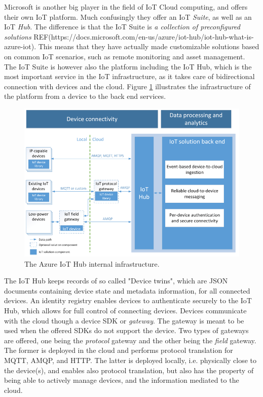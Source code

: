 Microsoft is another big player in the field of IoT Cloud computing, and offers their own IoT platform. Much confusingly they offer an IoT \textit{Suite}, as well as an IoT \textit{Hub}. The difference is that the IoT Suite is \textit{a collection of preconfigured solutions} REF(https://docs.microsoft.com/en-us/azure/iot-hub/iot-hub-what-is-azure-iot). This means that they have actually made customizable solutions based on common IoT scenarios, such as remote monitoring and asset management. The IoT Suite is however also the platform including the IoT Hub, which is the most important service in the IoT infrastructure, as it takes care of bidirectional connection with devices and the cloud. Figure \ref{fig:azure:infrastructure} illustrates the infrastructure of the platform from a device to the back end services. 

\begin{figure}[h!]
	\centering
	\includegraphics[width=\textwidth]{figures/azure/infrastructure.png}
	\caption{The Azure IoT Hub internal infrastructure.}
	\label{fig:azure:infrastructure}
\end{figure}


The IoT Hub keeps records of so called "Device twins", which are JSON documents containing device state and metadata information, for all connected devices. An identity registry enables devices to authenticate securely to the IoT Hub, which allows for full control of connecting devices. Devices communicate with the cloud though a device SDK or \textit{gateway}. The gateway is meant to be used when the offered SDKs do not support the device. Two types of gateways are offered, one being the \textit{protocol} gateway and the other being the \textit{field} gateway. The former is deployed in the cloud and performs protocol translation for MQTT, AMQP, and HTTP. The latter is deployed locally, i.e. physically close to the device(s), and enables also protocol translation, but also has the property of being able to actively manage devices, and the information mediated to the cloud. \\


